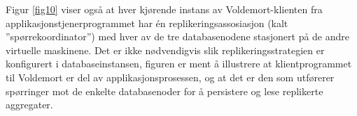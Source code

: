 Figur \ref{fig10} viser også at hver kjørende instans av Voldemort-klienten fra applikasjonstjenerprogrammet har én replikeringsassosiasjon (kalt ''spørrekoordinator'') med hver av de tre databasenodene stasjonert på de andre virtuelle maskinene. Det er ikke nødvendigvis slik replikeringsstrategien er konfigurert i databaseinstansen, figuren er ment å illustrere at klientprogrammet til Voldemort er del av applikasjonsprosessen, og at det er den som utførerer spørringer mot de enkelte databasenoder for å persistere og lese replikerte aggregater.

